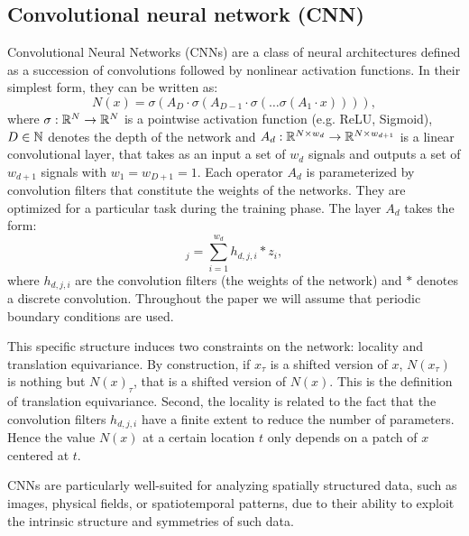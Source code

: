 \documentclass[a4paper,10pt]{article}
\begin{document}
\subsection{Convolutional neural network (CNN)}
Convolutional Neural Networks (CNNs) are a class of neural architectures defined as a succession of convolutions followed by nonlinear activation functions. 
In their simplest form, they can be written as:
\begin{equation*}
    N(x)  = \sigma\left( A_D \cdot \sigma \left( A_{D-1} \cdot \sigma \left( \hdots \sigma\left( A_1 \cdot x \right)\right)\right)\right),
\end{equation*}
where $\sigma: \mathbb{R}^N\to \mathbb{R}^N$ is a pointwise activation function (e.g. ReLU,  Sigmoid), $D\in \mathbb{N}$ denotes the depth of the network and $A_d : \mathbb{R}^{N\times w_d}\to \mathbb{R}^{N\times w_{d+1}}$ is a linear convolutional layer, that takes as an input a set of $w_d$ signals and outputs a set of $w_{d+1}$ signals with $w_1=w_{D+1} = 1$. Each operator $A_d$ is parameterized by convolution filters that constitute the weights of the networks. 
They are optimized for a particular task during the training phase. 
The layer $A_d$ takes the form:
\begin{equation}
    [A_d \cdot \{z_1,\hdots, z_{w_d}\}]_{j} = \sum_{i=1}^{w_d} h_{d,j,i} * z_i, 
\end{equation}
where $h_{d,j,i}$ are the convolution filters (the weights of the network) and $*$ denotes a discrete convolution. Throughout the paper we will assume that periodic boundary conditions are used. 

This specific structure induces two constraints on the network: locality and translation equivariance. 
By construction, if $x_\tau$ is a shifted version of $x$, $N(x_\tau)$ is nothing but $N(x)_{\tau}$, that is a shifted version of $N(x)$. 
This is the definition of translation equivariance.
Second, the locality is related to the fact that the convolution filters $h_{d,j,i}$ have a finite extent to reduce the number of parameters. 
Hence the value $N(x)$ at a certain location $t$ only depends on a patch of $x$ centered at $t$. 

CNNs are particularly well-suited for analyzing spatially structured data, such as images, physical fields, or spatiotemporal patterns, due to their ability to exploit the intrinsic structure and symmetries of such data. 
\end{document}
